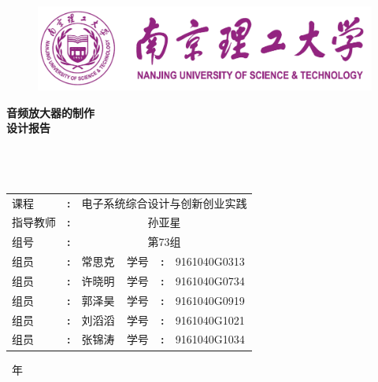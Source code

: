 \documentclass[12pt]{article}
\date{}
\renewcommand\figurename{\heiti\zihao{5} 图}
\renewcommand\tablename{\heiti\zihao{5} 表}
\begin{document}

\renewcommand{\contentsname}{\centerline{目录}}
\renewcommand{\tablename}{表}
\renewcommand{\figurename}{图}
\renewcommand\refname{参考文献}
\renewcommand\appendix{\setcounter{secnumdepth}{0}}
\renewcommand\abstractname{摘要}
\begin{figure}[h]
  \centering
  \includegraphics[width=.6\textwidth]{logo}
\end{figure}
\thispagestyle{empty}
\begin{center}
\begin{songti}
\textbf{音频放大器的制作}\\
\textbf{设计报告}\\\ \\\
\\ \
\renewcommand\arraystretch{1.5}
\begin{tabular}{p{2.5cm}<{\centering} p{0.2cm}<{\centering} p{3.5cm}<{\centering} p{2.5cm}<{\centering} p{0.2cm}<{\centering} p{3.5cm}<{\centering}}
 课程&\textbf{:}&\multicolumn{4}{c}{电子系统综合设计与创新创业实践}\\\cline{3-6}
指导教师&\textbf{:}&\multicolumn{4}{c}{孙亚星}\\\cline{3-6}
组号&\textbf{:}&\multicolumn{4}{c}{第73组}\\\cline{3-6}
组员&\textbf{:}&常思克&学号&\textbf{:}&9161040G0313\\\cline{3-3}\cline{6-6}
组员&\textbf{:}&许晓明&学号&\textbf{:}&9161040G0734\\\cline{3-3}\cline{6-6}
组员&\textbf{:}&郭泽昊&学号&\textbf{:}&9161040G0919\\\cline{3-3}\cline{6-6}
组员&\textbf{:}&刘滔滔&学号&\textbf{:}&9161040G1021\\\cline{3-3}\cline{6-6}
组员&\textbf{:}&张锦涛 &学号&\textbf{:}&9161040G1034\\\cline{3-3}\cline{6-6}
\end{tabular}
\end{songti}
\end{center}
\begin{table}[b]
  \centering
\number\year\ 年\ \number{}
\end{table}

\newpage
{}
\newpage
\tableofcontents
\thispagestyle{empty}
\newpage
\setcounter{page}{1}
\end{document}
